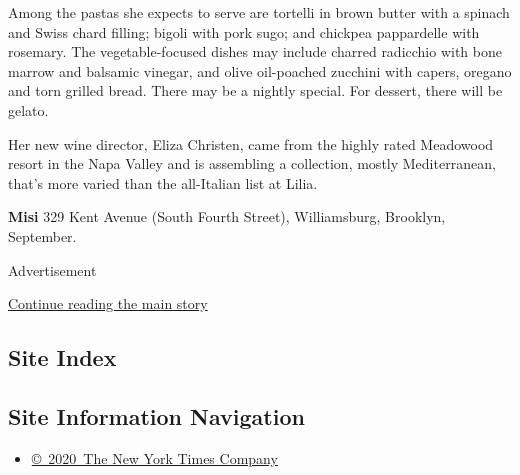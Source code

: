 Among the pastas she expects to serve are tortelli in brown butter with
a spinach and Swiss chard filling; bigoli with pork sugo; and chickpea
pappardelle with rosemary. The vegetable-focused dishes may include
charred radicchio with bone marrow and balsamic vinegar, and olive
oil-poached zucchini with capers, oregano and torn grilled bread. There
may be a nightly special. For dessert, there will be gelato.

Her new wine director, Eliza Christen, came from the highly rated
Meadowood resort in the Napa Valley and is assembling a collection,
mostly Mediterranean, that's more varied than the all-Italian list at
Lilia.

\textbf{Misi} 329 Kent Avenue (South Fourth Street), Williamsburg,
Brooklyn, September.

Advertisement

\protect\hyperlink{after-bottom}{Continue reading the main story}

\hypertarget{site-index}{%
\subsection{Site Index}\label{site-index}}

\hypertarget{site-information-navigation}{%
\subsection{Site Information
Navigation}\label{site-information-navigation}}

\begin{itemize}
\tightlist
\item
  \href{https://help.nytimes3xbfgragh.onion/hc/en-us/articles/115014792127-Copyright-notice}{©~2020~The
  New York Times Company}
\end{itemize}


